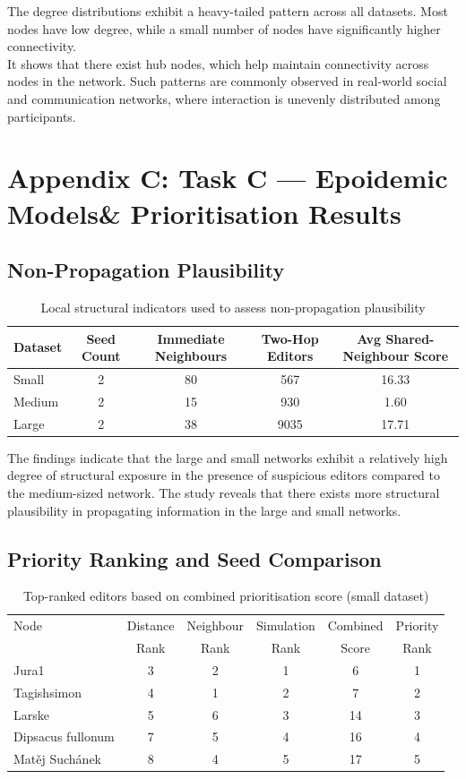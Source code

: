 \documentclass[acmsmall,nonacm,natbib=false]{acmart}
\begin{document}
The degree distributions exhibit a heavy-tailed pattern across all datasets. Most nodes have low degree, while a small number of nodes have significantly higher connectivity.\\
It shows that there exist hub nodes, which help maintain connectivity across nodes in the network. Such patterns are commonly observed in real-world social and communication networks, where interaction is unevenly distributed among participants.


\section{Appendix C: Task C — Epoidemic Models\& Prioritisation Results}
\label{appendix:taskC}

\subsection{Non-Propagation Plausibility}
\label{appendix:taskC_plausibility}
\label{appendix:C.1}
\begin{table}[H]
\centering
\caption{Local structural indicators used to assess non-propagation plausibility}
\begin{tabular}{lcccc}
\toprule
Dataset & Seed Count & Immediate Neighbours & Two-Hop Editors & Avg Shared-Neighbour Score \\
\midrule
Small  & 2 & 80 & 567 & 16.33 \\
Medium & 2 & 15 & 930 & 1.60 \\
Large  & 2 & 38 & 9035 & 17.71 \\
\bottomrule
\end{tabular}
\end{table}

The findings indicate that the large and small networks exhibit a relatively high degree of structural exposure in the presence of suspicious editors compared to the medium-sized network. The study reveals that there exists more structural plausibility in propagating information in the large and small networks.


\subsection{Priority Ranking and Seed Comparison}
\label{appendix:taskC_priority}
\label{appendix:C.2}
\begin{table}[H]
\centering
\caption{Top-ranked editors based on combined prioritisation score (small dataset)}
\begin{tabular}{lccccc}
\toprule
Node & Distance  & Neighbour & Simulation & Combined & Priority \\
 & Rank & Rank & Rank & Score & Rank \\
\midrule
Jura1 & 3 & 2 & 1 & 6 & 1 \\
Tagishsimon & 4 & 1 & 2 & 7 & 2 \\
Larske & 5 & 6 & 3 & 14 & 3 \\
Dipsacus fullonum & 7 & 5 & 4 & 16 & 4 \\
Matěj Suchánek & 8 & 4 & 5 & 17 & 5 \\
\bottomrule
\end{tabular}
\end{table}
\end{document}
